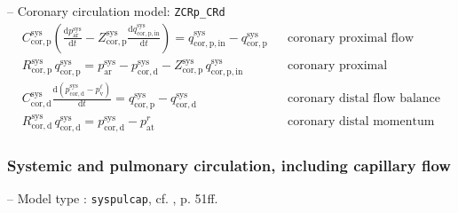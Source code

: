 \documentclass[a4paper,12pt]{report}
\begin{document}
-- Coronary circulation model: \verb"ZCRp_CRd"\\
\begin{align}
&C_{\mathrm{cor,p}}^{\mathrm{sys}} \left(\frac{\mathrm{d}p_{\mathrm{ar}}^{\mathrm{sys}}}{\mathrm{d}t}-Z_{\mathrm{cor,p}}^{\mathrm{sys}}\frac{\mathrm{d}q_{\mathrm{cor,p,in}}^{\mathrm{sys}}}{\mathrm{d}t}\right) = q_{\mathrm{cor,p,in}}^{\mathrm{sys}} - q_{\mathrm{cor,p}}^{\mathrm{sys}} && \text{coronary proximal flow balance}\nonumber\\
&R_{\mathrm{cor,p}}^{\mathrm{sys}}\,q_{\mathrm{cor,p}}^{\mathrm{sys}}=p_{\mathrm{ar}}^{\mathrm{sys}}-p_{\mathrm{cor,d}}^{\mathrm{sys}} - Z_{\mathrm{cor,p}}^{\mathrm{sys}}\,q_{\mathrm{cor,p,in}}^{\mathrm{sys}} && \text{coronary proximal momentum}\nonumber\\
&C_{\mathrm{cor,d}}^{\mathrm{sys}} \frac{\mathrm{d}(p_{\mathrm{cor,d}}^{\mathrm{sys}}-p_{\mathrm{v}}^{\ell})}{\mathrm{d}t} = q_{\mathrm{cor,p}}^{\mathrm{sys}} - q_{\mathrm{cor,d}}^{\mathrm{sys}} && \text{coronary distal flow balance}\nonumber\\
&R_{\mathrm{cor,d}}^{\mathrm{sys}}\,q_{\mathrm{cor,d}}^{\mathrm{sys}}=p_{\mathrm{cor,d}}^{\mathrm{sys}}-p_{\mathrm{at}}^{r} && \text{coronary distal momentum}\nonumber
\end{align}





\subsubsection{Systemic and pulmonary circulation, including capillary flow}

-- Model type : \verb"syspulcap", cf. \cite{hirschvogel2019disspub}, p. 51ff.\\
\end{document}
